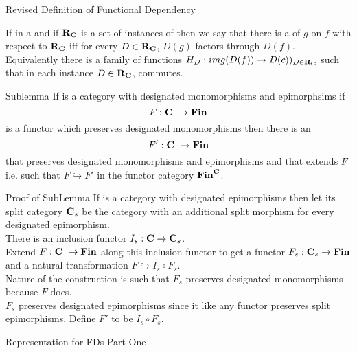 \begin{frame}{Revised Definition of Functional Dependency}{\slidecontext}
\begin{definition}
If \scalebox{0.9}{\fgsourcediagram} in a \catMEterm \catcw  and if $\textbf{R}_{\textbf{C}}$ is a set of instances of \catcw
then we say that there is a   of $g$ on $f$ with respect to $\textbf{R}_{\textbf{C}}$ iff
for every $D \in \textbf{R}_{\textbf{C}}$, $D(g)$ factors through $D(f)$. \\
\medskip
\pause Equivalently there is a family of  functions $H_D:img(D(f)) \rightarrow D(c))_{D \in \textbf{R}_{\textbf{C}}}$
such that in each instance $D \in \textbf{R}_{\textbf{C}}$,
 commutes.
\end{definition}
\end{frame}


\begin{frame}{Sublemma}
If \catcw is a category with designated monomorphisms and epimorphsims 
if 
 $$F: \textbf{C}\  \rightarrow \textbf{Fin}$$
  is a functor which preserves designated monomorphisms
then there is an 
$$F':\textbf{C}\  \rightarrow \textbf{Fin}$$
that preserves designated monomorphisms and epimorphisms
and that extends $F$ i.e. such that $F \hookrightarrow F'$ in the functor category $\textbf{Fin}^{\textbf{C}}$.
\end{frame}

\begin{frame}{Proof of SubLemma}
If \catcw is a category with designated epimorphisms then let its split category 
$\textbf{C}_s$ be the category \catcw with an additional split morphism for every designated epimorphism.\\
\medskip
There is an inclusion functor $I_s:\textbf{C} \rightarrow \textbf{C}_s$.\\
\medskip
Extend $F:\textbf{C}\  \rightarrow \textbf{Fin}$ along this inclusion functor  to get a functor 
$F_s:\textbf{C}_s \rightarrow \textbf{Fin}$ and a natural transformation $F \hookrightarrow I_s \circ F_s$. \\
\medskip
Nature of the construction is such that $F_s$ preserves designated monomorphisms because $F$ does.\\
\medskip
$F_s$ preserves designated epimorphisms since it like any functor preserves split epimorphisms.
Define $F'$ to be $I_s \circ F_s$.
\end{frame}

\begin{frame}{Representation for FDs Part One}{\slidecontext}
\representationLemmaPartOne
\end{frame}

